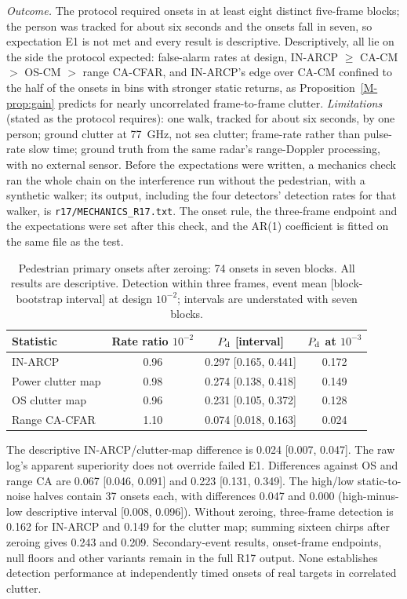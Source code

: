 \documentclass[10pt]{article}
\begin{document}
\emph{Outcome.} The protocol required onsets in at least eight distinct five-frame blocks; the person was tracked for about six seconds and the onsets fall in seven, so expectation E1 is not met and every result is descriptive. Descriptively, all lie on the side the protocol expected: false-alarm rates at design, IN-ARCP $\ge$ CA-CM $>$ OS-CM $>$ range CA-CFAR, and IN-ARCP's edge over CA-CM confined to the half of the onsets in bins with stronger static returns, as Proposition~\ref{M-prop:gain} predicts for nearly uncorrelated frame-to-frame clutter. \emph{Limitations} (stated as the protocol requires): one walk, tracked for about six seconds, by one person; ground clutter at 77~GHz, not sea clutter; frame-rate rather than pulse-rate slow time; ground truth from the same radar's range-Doppler processing, with no external sensor. Before the expectations were written, a mechanics check ran the whole chain on the interference run without the pedestrian, with a synthetic walker; its output, including the four detectors' detection rates for that walker, is \texttt{r17/MECHANICS\_R17.txt}. The onset rule, the three-frame endpoint and the expectations were set after this check, and the AR(1) coefficient is fitted on the same file as the test.



\begin{table}[htbp]
\centering\small\setlength{\tabcolsep}{4pt}
\caption{Pedestrian primary onsets after zeroing: 74 onsets in seven blocks. All results are descriptive. Detection within three frames, event mean [block-bootstrap interval] at design $10^{-2}$; intervals are understated with seven blocks.}\label{tab:pedestrian}
\begin{tabular}{lccc}
\toprule
Statistic & Rate ratio $10^{-2}$ & $P_{\rm d}$ [interval] & $P_{\rm d}$ at $10^{-3}$ \\
\midrule
IN-ARCP & 0.96 & 0.297 [0.165, 0.441] & 0.172 \\
Power clutter map & 0.98 & 0.274 [0.138, 0.418] & 0.149 \\
OS clutter map & 0.96 & 0.231 [0.105, 0.372] & 0.128 \\
Range CA-CFAR & 1.10 & 0.074 [0.018, 0.163] & 0.024 \\
\bottomrule
\end{tabular}
\end{table}

The descriptive IN-ARCP/clutter-map difference is 0.024 [0.007, 0.047]. The raw log's apparent superiority does not override failed E1. Differences against OS and range CA are 0.067 [0.046, 0.091] and 0.223 [0.131, 0.349]. The high/low static-to-noise halves contain 37 onsets each, with differences 0.047 and 0.000 (high-minus-low descriptive interval [0.008, 0.096]). Without zeroing, three-frame detection is 0.162 for IN-ARCP and 0.149 for the clutter map; summing sixteen chirps after zeroing gives 0.243 and 0.209. Secondary-event results, onset-frame endpoints, null floors and other variants remain in the full R17 output. None establishes detection performance at independently timed onsets of real targets in correlated clutter.
\end{document}

